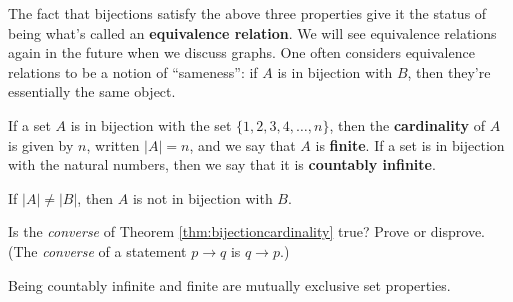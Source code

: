 \begin{remark} The fact that bijections satisfy the above three properties give it the status of being what's called an \textbf{equivalence relation}.  We will see equivalence relations again in the future when we discuss graphs.  One often considers equivalence relations to be a notion of ``sameness'': if $A$ is in bijection with $B$, then they're essentially the same object.
\end{remark}

\begin{definition} If a set $A$ is in bijection with the set $\{1, 2, 3, 4, \ldots, n\}$, then the \textbf{cardinality} of $A$ is given by $n$, written $|A| = n$, and we say that $A$ is \textbf{finite}.  If a set is in bijection with the natural numbers, then we say that it is \textbf{countably infinite}.\end{definition}

\begin{theorem} \label{thm:bijectioncardinality} If $|A|\neq |B|$, then $A$ is not in bijection with $B$. \end{theorem}

\begin{question} Is the \textit{converse} of Theorem \ref{thm:bijectioncardinality} true?  Prove or disprove. (The \textit{converse} of a statement $p \to q$ is $q \to p$.)
\end{question}

\begin{theorem} Being countably infinite and finite are mutually exclusive set properties. \end{theorem}




